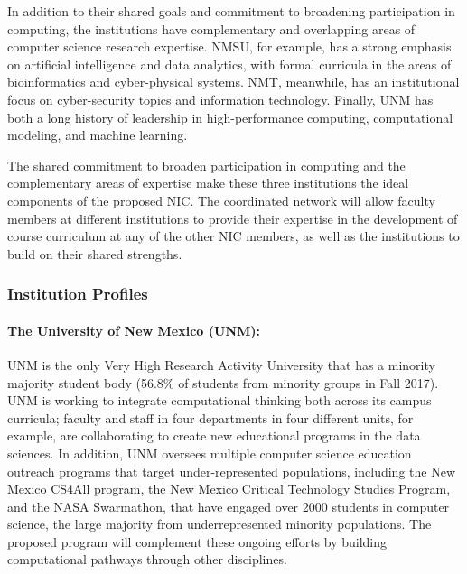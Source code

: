 In addition to their shared goals and commitment to broadening participation in computing, the institutions have complementary and overlapping areas of computer science research expertise. 
NMSU, for example, has a strong emphasis on artificial intelligence and data analytics, with formal curricula in the areas of bioinformatics and cyber-physical systems. NMT, meanwhile, has an institutional focus on cyber-security topics and information technology. Finally, UNM has both a long history of leadership in high-performance computing, computational modeling, and machine learning.

The shared commitment to broaden participation in computing and the complementary areas of expertise make these three institutions the ideal components of the proposed NIC. The coordinated network will allow faculty members at different institutions to provide their expertise in the development of course curriculum at any of the other NIC members, as well as the institutions to build on their shared strengths. 

\subsubsection{Institution Profiles}
\paragraph{The University of New Mexico (UNM):}

UNM is the only Very High Research Activity University that has a minority majority student body (56.8\% of students from minority groups in Fall 2017). UNM is working to integrate computational thinking both across its campus curricula;%
faculty and staff in four departments in four different units, for example, are collaborating to create new educational programs in the data sciences. In addition, UNM oversees multiple computer science education outreach programs that target under-represented populations, including  the New Mexico CS4All program, the New Mexico Critical Technology Studies Program, and the NASA Swarmathon, that have engaged over 2000 students in computer science, the large majority from underrepresented minority populations. The proposed program will complement these ongoing efforts by building computational pathways through other disciplines. 

